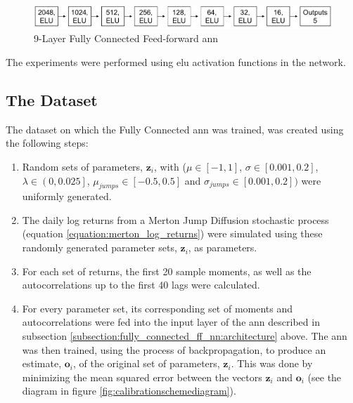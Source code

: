 \documentclass[11pt,oneside,openany,a4paper,english, report, goldenblock
]{usthesis}
\begin{document}
\begin{figure}[h]
	\centering
	\includegraphics[width=1\linewidth]{Images/Diagrams/Network-Structures/MultipleOutputFullyConnectedANN}
	\caption[Multiple Output Prediction \acrshort{ann}]{9-Layer Fully Connected Feed-forward \acrshort{ann}}
	\label{fig:multipleoutputcnn}
\end{figure}

The experiments were performed using \acrshort{elu} activation functions in the network. 

\subsection{The Dataset}

The dataset on which the Fully Connected \acrshort{ann} was trained, was created using the following steps:
\begin{enumerate}[1)]
	\itemsep0em 
	\item  Random sets of parameters, $\mathbf{z}_i$, with ($\mu \in \left[-1, 1\right]$, $\sigma \in \left[0.001, 0.2\right]$, $\lambda \in \left(0, 0.025\right]$, $\mu_{jumps} \in \left[-0.5, 0.5\right]$ and $\sigma_{jumps} \in \left[0.001, 0.2\right])$ were uniformly generated.
	\item  The daily log returns from a Merton Jump Diffusion stochastic process (equation \ref{equation:merton_log_returns}) were simulated using these randomly generated parameter sets, $\mathbf{z}_i$, as parameters.
	\item  For each set of returns, the first 20 sample moments, as well as the autocorrelations up to the first 40 lags were calculated.
	\item For every parameter set, its corresponding set of moments and autocorrelations were fed into the input layer of the \acrshort{ann} described in subsection \ref{subsection:fully_connected_ff_nn:architecture} above. The \acrshort{ann} was then trained, using the process of backpropagation, to produce an estimate, $\mathbf{o}_i$, of the original set of parameters, $\mathbf{z}_i$. This was done by minimizing the mean squared error between the vectors $\mathbf{z}_i$ and $\mathbf{o}_i$ (see the diagram in figure \ref{fig:calibrationschemediagram}).
\end{enumerate}
\end{document}
